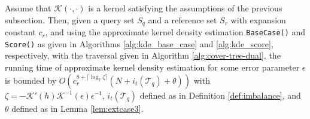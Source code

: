 \begin{thm}
Assume that $\mathcal{K}(\cdot, \cdot)$ is a kernel satisfying the assumptions
of the previous subsection.  Then, given a query set $S_q$ and a reference set
$S_r$ with expansion constant $c_r$, and using the approximate kernel density
estimation \texttt{BaseCase()} and \texttt{Score()} as given in Algorithms
\ref{alg:kde_base_case} and \ref{alg:kde_score}, respectively, with the
traversal given in Algorithm \ref{alg:cover-tree-dual}, the running time of
approximate kernel density estimation for some error parameter $\epsilon$ is
bounded by
$O(c_r^{8 + \lceil \log_2 \zeta \rceil} (N + i_t(\mathscr{T}_q) + \theta))$
with $\zeta = -\mathcal{K}'(h) \mathcal{K}^{-1}(\epsilon) \epsilon^{-1}$,
$i_t(\mathscr{T}_q)$ defined as in Definition \ref{def:imbalance}, and $\theta$
defined as in Lemma \ref{lem:extcase3}.

\label{thm:kde-bound}
\end{thm}


